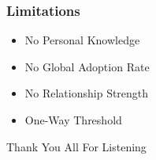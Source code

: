 \documentclass[slidestop,usenames,dvipsnames]{beamer}
\newcommand{\fitem}{\pause\vfill\item}
\begin{document}
\begin{frame}
    \frametitle{Limitations}
    \begin{itemize}
        \fitem No Personal Knowledge
        \fitem No Global Adoption Rate
        \fitem No Relationship Strength
        \fitem One-Way Threshold
    \end{itemize}
    \vfill
\end{frame}




\begin{frame}
    \vfill
    \begin{center}
        {\Huge Thank You All For Listening}\
    \end{center}
\end{frame}
\end{document}
